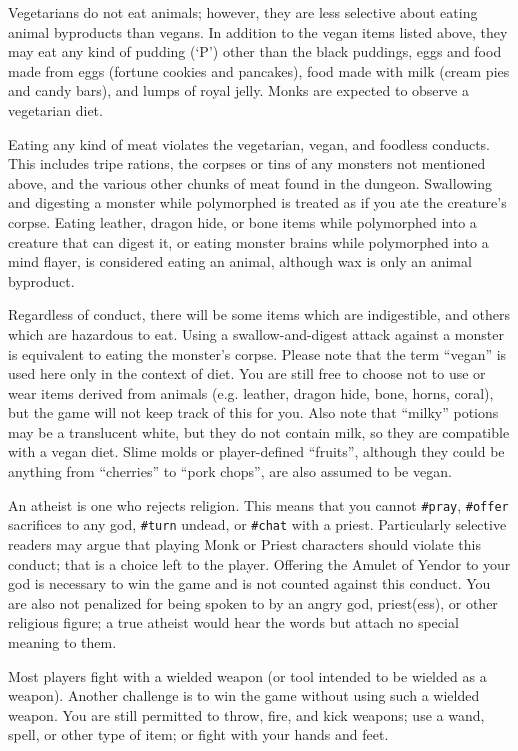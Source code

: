 Vegetarians do not eat animals;
however, they are less selective about eating animal byproducts than vegans.
In addition to the vegan items listed above, they may eat any kind
of pudding (`P') other than the black puddings,
eggs and food made from eggs (fortune cookies and pancakes),
food made with milk (cream pies and candy bars), and lumps of
royal jelly.  Monks are expected to observe a vegetarian diet.

Eating any kind of meat violates the vegetarian, vegan, and foodless
conducts.  This includes tripe rations, the corpses or tins of any
monsters not mentioned above, and the various other chunks of meat
found in the dungeon.  Swallowing and digesting a monster while polymorphed
is treated as if you ate the creature's corpse.
Eating leather, dragon hide, or bone items while
polymorphed into a creature that can digest it, or eating monster brains
while polymorphed into a mind flayer, is considered eating
an animal, although wax is only an animal byproduct.

Regardless of conduct, there will be some items which are indigestible,
and others which are hazardous to eat.  Using a swallow-and-digest
attack against a monster is equivalent to eating the monster's corpse.
Please note that the term ``vegan'' is used here only in the context of
diet.  You are still free to choose not to use or wear items derived
from animals (e.g. leather, dragon hide, bone, horns, coral), but the
game will not keep track of this for you.  Also note that ``milky''
potions may be a translucent white, but they do not contain milk,
so they are compatible with a vegan diet.  Slime molds or
player-defined ``fruits'', although they could be anything
from ``cherries'' to ``pork chops'', are also assumed to be vegan.

An atheist is one who rejects religion.  This means that you cannot
{\tt \#pray}, {\tt \#offer} sacrifices to any god,
{\tt \#turn} undead, or {\tt \#chat} with a priest.
Particularly selective readers may argue that playing Monk or Priest
characters should violate this conduct; that is a choice left to the
player.  Offering the Amulet of Yendor to your god is necessary to
win the game and is not counted against this conduct.  You are also
not penalized for being spoken to by an angry god, priest(ess), or
other religious figure; a true atheist would hear the words but
attach no special meaning to them.

Most players fight with a wielded weapon (or tool intended to be
wielded as a weapon).  Another challenge is to win the game without
using such a wielded weapon.  You are still permitted to throw,
fire, and kick weapons; use a wand, spell, or other type of item;
or fight with your hands and feet.

